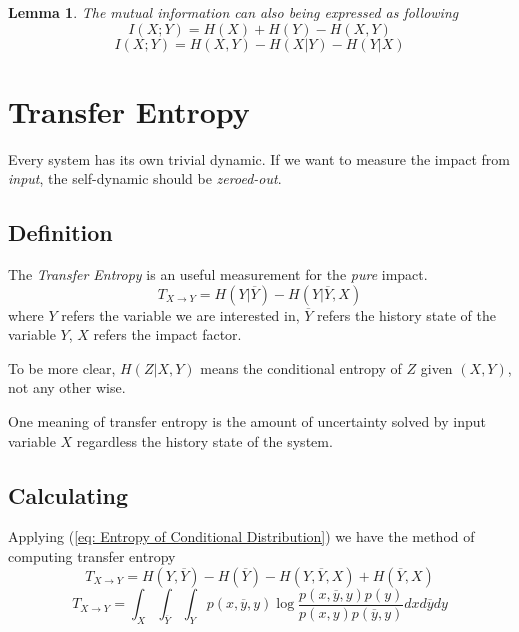 \documentclass[a4paper]{article}
\newtheorem{lemma}{Lemma}[section]
\begin{document}
\begin{lemma}
    The mutual information can also being expressed as following
    \begin{equation}
        I(X; Y) = H(X) + H(Y) - H(X, Y)
    \end{equation}
    \begin{equation}
        I(X; Y) = H(X, Y) - H(X|Y) - H(Y|X)
    \end{equation}
\end{lemma}

\section{Transfer Entropy}
Every system has its own trivial dynamic.
If we want to measure the impact from \emph{input}, the self-dynamic should be \emph{zeroed-out}.

\subsection{Definition}

The \emph{Transfer Entropy} is an useful measurement for the \emph{pure} impact.
\begin{equation}
    T_{X \rightarrow Y} = H(Y|\overline{Y}) - H(Y|\overline{Y}, X)
    \label{eq: Transfer Entropy}
\end{equation}
where $Y$ refers the variable we are interested in, $\overline{Y}$ refers the history state of the variable $Y$, $X$ refers the impact factor.

To be more clear, $H(Z|X, Y)$ means the conditional entropy of $Z$ given $(X, Y)$, not any other wise.

One meaning of transfer entropy is the amount of uncertainty solved by input variable $X$ regardless the history state of the system.

\subsection{Calculating}
Applying (\ref{eq: Entropy of Conditional Distribution}) we have the method of computing transfer entropy
\begin{equation}
    T_{X \rightarrow Y} = H(Y, \overline{Y}) - H(\overline{Y}) - H(Y, \overline{Y}, X) + H(\overline{Y}, X)
\end{equation}
\begin{equation}
    T_{X \rightarrow Y} = \int_{X} \int_{\overline{Y}} \int_{Y} p(x, \overline{y}, y) \log{\frac{p(x, \overline{y}, y) p(y)}{p(x, y) p(\overline{y}, y)}} dx d\overline{y} dy
\end{equation}
\end{document}
